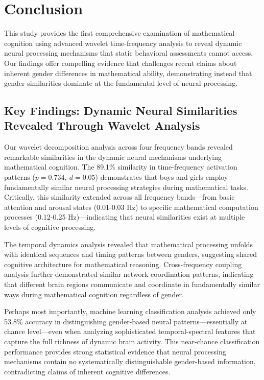 \documentclass[12pt, a4paper]{article}
\begin{document}
\section{Conclusion}
This study provides the first comprehensive examination of mathematical cognition using advanced wavelet time-frequency analysis to reveal dynamic neural processing mechanisms that static behavioral assessments cannot access. Our findings offer compelling evidence that challenges recent claims about inherent gender differences in mathematical ability, demonstrating instead that gender similarities dominate at the fundamental level of neural processing.


\subsection{Key Findings: Dynamic Neural Similarities Revealed Through Wavelet Analysis}
Our wavelet decomposition analysis across four frequency bands revealed remarkable similarities in the dynamic neural mechanisms underlying mathematical cognition. The 89.1\% similarity in time-frequency activation patterns ($p = 0.734,~d = 0.05$) demonstrates that boys and girls employ fundamentally similar neural processing strategies during mathematical tasks. Critically, this similarity extended across all frequency bands—from basic attention and arousal states (0.01-0.03 Hz) to specific mathematical computation processes (0.12-0.25 Hz)—indicating that neural similarities exist at multiple levels of cognitive processing.

The temporal dynamics analysis revealed that mathematical processing unfolds with identical sequences and timing patterns between genders, suggesting shared cognitive architecture for mathematical reasoning. Cross-frequency coupling analysis further demonstrated similar network coordination patterns, indicating that different brain regions communicate and coordinate in fundamentally similar ways during mathematical cognition regardless of gender.

Perhaps most importantly, machine learning classification analysis achieved only 53.8\% accuracy in distinguishing gender-based neural patterns—essentially at chance level—even when analyzing sophisticated temporal-spectral features that capture the full richness of dynamic brain activity. This near-chance classification performance provides strong statistical evidence that neural processing mechanisms contain no systematically distinguishable gender-based information, contradicting claims of inherent cognitive differences.
\end{document}
